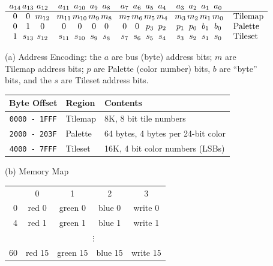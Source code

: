 \documentclass[11pt]{article}
\begin{document}
\begin{figure}[p]
\[  
\begin{array}{*3{c@{\,}}*3{@{\ \ }*4{c@{\,}}}@{\quad}l}
  a_{14}&a_{13}&a_{12}&a_{11}&a_{10}&a_{9}&a_{8}&a_{7}&a_{6}&a_{5}&a_{4}&a_{3}&a_{2}&a_{1}&a_{0}\\
  \hline
 0&0&m_{12}& m_{11}&m_{10}&m_9&m_8& m_7&m_6&m_5&m_4 &m_3&m_2&m_1&m_0 &\text{Tilemap} \\
 0&1&0& 0&0&0&0& 0&0&p_3&p_2 &p_1&p_0&b_1&b_0 &\text{Palette} \\
 1&s_{13}&s_{12}& s_{11}&s_{10}&s_9&s_8& s_7&s_6&s_5&s_4 &s_3&s_2&s_1&s_0 &\text{Tileset} \\
  \end{array}
\]

(a) Address Encoding:  the $a$ are
bus (byte) address bits; $m$ are Tilemap address bits; $p$ are Palette
(color number) bits, $b$ are ``byte'' bits, and the $s$ are Tileset
address bits.

\begin{center}
\begin{tabular}{cll}
  \textbf{Byte Offset} & \textbf{Region} & \textbf{Contents} \\
  \hline
  \texttt{0000 - 1FFF} & Tilemap & 8K, 8 bit tile numbers \\
  \texttt{2000 - 203F} & Palette & 64 bytes, 4 bytes per 24-bit color \\
  \texttt{4000 - 7FFF} & Tileset & 16K, 4 bit color numbers (LSBs) \\
  \hline
\end{tabular}

\medskip

(b) Memory Map
\end{center}

\begin{tabular}{r|c|c|c|c|}
\multicolumn{1}{c}{} &
  \multicolumn{1}{c}{0} &
  \multicolumn{1}{c}{1} &
  \multicolumn{1}{c}{2} &
  \multicolumn{1}{c}{3} \\
  \cline{2-5}
  0 & red 0 & green 0 & blue 0 & write 0 \\
  \cline{2-5}
  4 & red 1 & green 1 & blue 1 & write 1 \\
  \cline{2-5}
\multicolumn{1}{c}{} & \multicolumn{4}{c}{$\vdots$} \\
  \cline{2-5}
  60 & red 15 & green 15 & blue 15 & write 15 \\
  \cline{2-5}
\end{tabular}
\hfill
\begin{minipage}{0.45\textwidth}


\end{minipage}
\end{figure}
\end{document}
